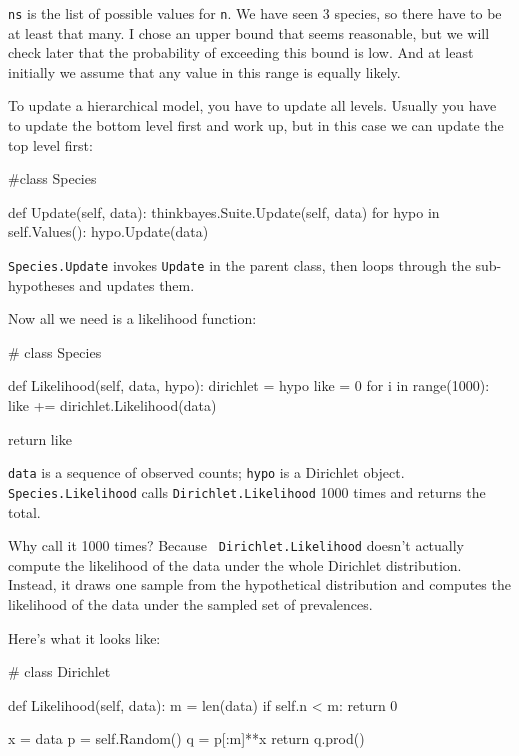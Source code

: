 \documentclass[12pt]{book}
\theoremstyle{exercise}
\begin{document}
{\tt ns} is the list of possible values for {\tt n}.  We have seen 3
species, so there have to be at least that many.  I chose an upper
bound that seems reasonable, but we will check later that the
probability of exceeding this bound is low.  And at least initially
we assume that any value in this range is equally likely.

To update a hierarchical model, you have to update all levels.
Usually you have to update the bottom
level first and work up, but in this case we can
update the top level first:

\begin{code}
#class Species

    def Update(self, data):
        thinkbayes.Suite.Update(self, data)
        for hypo in self.Values():
            hypo.Update(data)
\end{code}

{\tt Species.Update} invokes {\tt Update} in the parent class,
then loops through the sub-hypotheses and updates them.

Now all we need is a likelihood function:

\begin{code}
# class Species

    def Likelihood(self, data, hypo):
        dirichlet = hypo
        like = 0
        for i in range(1000):
            like += dirichlet.Likelihood(data)

        return like
\end{code}

{\tt data} is a sequence of
observed counts; {\tt hypo} is a Dirichlet object.
{\tt Species.Likelihood} calls
{\tt Dirichlet.Likelihood} 1000 times and returns the total.

Why call it 1000 times?  Because {\tt
  Dirichlet.Likelihood} doesn't actually compute the likelihood of the
data under the whole Dirichlet distribution.  Instead, it draws one
sample from the hypothetical distribution and computes the likelihood
of the data under the sampled set of prevalences.

Here's what it looks like:

\begin{code}
# class Dirichlet

    def Likelihood(self, data):
        m = len(data)
        if self.n < m:
            return 0

        x = data
        p = self.Random()
        q = p[:m]**x
        return q.prod()
\end{code}
\end{document}
